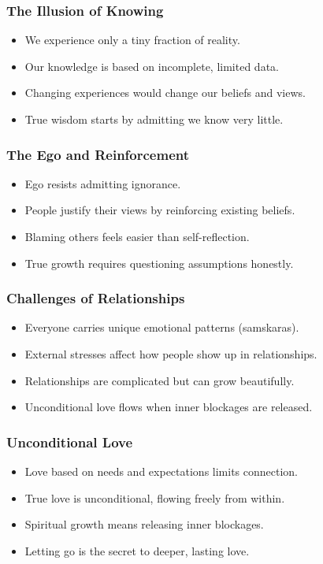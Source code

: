 \begin{frame}[fragile]\frametitle{The Illusion of Knowing}
  \begin{itemize}
    \item We experience only a tiny fraction of reality.
    \item Our knowledge is based on incomplete, limited data.
    \item Changing experiences would change our beliefs and views.
    \item True wisdom starts by admitting we know very little.
  \end{itemize}
\end{frame}

\begin{frame}[fragile]\frametitle{The Ego and Reinforcement}
  \begin{itemize}
    \item Ego resists admitting ignorance.
    \item People justify their views by reinforcing existing beliefs.
    \item Blaming others feels easier than self-reflection.
    \item True growth requires questioning assumptions honestly.
  \end{itemize}
\end{frame}

\begin{frame}[fragile]\frametitle{Challenges of Relationships}
  \begin{itemize}
    \item Everyone carries unique emotional patterns (samskaras).
    \item External stresses affect how people show up in relationships.
    \item Relationships are complicated but can grow beautifully.
    \item Unconditional love flows when inner blockages are released.
  \end{itemize}
\end{frame}

\begin{frame}[fragile]\frametitle{Unconditional Love}
  \begin{itemize}
    \item Love based on needs and expectations limits connection.
    \item True love is unconditional, flowing freely from within.
    \item Spiritual growth means releasing inner blockages.
    \item Letting go is the secret to deeper, lasting love.
  \end{itemize}
\end{frame}

